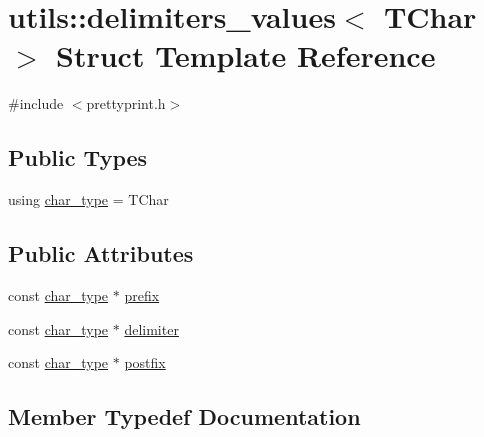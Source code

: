 \hypertarget{structutils_1_1delimiters__values}{}\section{utils\+::delimiters\+\_\+values$<$ T\+Char $>$ Struct Template Reference}
\label{structutils_1_1delimiters__values}


{\ttfamily \#include $<$prettyprint.\+h$>$}

\subsection*{Public Types}
\begin{DoxyCompactItemize}
\item 
using \mbox{\hyperlink{structutils_1_1delimiters__values_a57c630ca7c7819e86921e6404a9dd242}{char\+\_\+type}} = T\+Char
\end{DoxyCompactItemize}
\subsection*{Public Attributes}
\begin{DoxyCompactItemize}
\item 
const \mbox{\hyperlink{structutils_1_1delimiters__values_a57c630ca7c7819e86921e6404a9dd242}{char\+\_\+type}} $\ast$ \mbox{\hyperlink{structutils_1_1delimiters__values_ac07bd7e6fe8d3e8fff13c5e6568f1b18}{prefix}}
\item 
const \mbox{\hyperlink{structutils_1_1delimiters__values_a57c630ca7c7819e86921e6404a9dd242}{char\+\_\+type}} $\ast$ \mbox{\hyperlink{structutils_1_1delimiters__values_a221d9d84700c4da7cc9fe9461aad768e}{delimiter}}
\item 
const \mbox{\hyperlink{structutils_1_1delimiters__values_a57c630ca7c7819e86921e6404a9dd242}{char\+\_\+type}} $\ast$ \mbox{\hyperlink{structutils_1_1delimiters__values_a278a31da8954a469212236851e4a22ec}{postfix}}
\end{DoxyCompactItemize}


\subsection{Member Typedef Documentation}
\mbox{\label{structutils_1_1delimiters__values_a57c630ca7c7819e86921e6404a9dd242}} 
